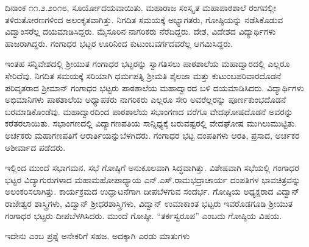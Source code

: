 {ದಿನಾಂಕ ೧೧.೨.೨೦೧೮, ಸೂರ್ಯೋದಯವಾಯಿತು. ಮಹಾರಾಜ ಸಂಸ್ಕೃತ ಮಹಾಪಾಠಶಾಲೆ ರಂಗವಲ್ಲೀ ತಳಿರುತೋರಣಗಳಿಂದ ಅಲಂಕೃತವಾಗಿತ್ತು. ನಿಗದಿತ ಸಮಯಕ್ಕೆ ಅಭ್ಯಾಗತರು, ಗೋಷ್ಠಿಯನ್ನು ನಡೆಸಿಕೊಡುವ ವಿದ್ವಾಂಸರೆಲ್ಲ ದಯಮಾಡಿಸಿದ್ದರು. ಮೈಸೂರಿನ ನಾಗರಿಕರು ನೆರೆದಿದ್ದರು. ದೇಶ, ವಿದೇಶದ ವಿದ್ಯಾರ್ಥಿಗಳು ಹಾಜರಾಗಿದ್ದರು. ಗಂಗಾಧರ ಭಟ್ಟರ ಊರಿನಿಂದ ಕುಟುಂಬವರ್ಗದವರೆಲ್ಲ ಆಗಮಿಸಿದ್ದರು. 

ಇಂತಹ ಸನ್ನಿವೇಶದಲ್ಲಿ ಶ್ರೀಯುತ ಗಂಗಾಧರ ಭಟ್ಟರನ್ನು ಸ್ವಾಗತಿಸಲು ಪಾಠ\-ಶಾಲೆಯ ಮಹಾದ್ವಾರದಲ್ಲಿ  ಎಲ್ಲರೂ ಸೇರಿದೆವು. ನಿಗದಿತ ಸಮಯಕ್ಕೆ ಸರಿಯಾಗಿ ಧರ್ಮಪತ್ನಿ ಶ್ರೀಮತಿ ಶೈಲಜಾ ಮತ್ತು ಕುಟುಂಬಪರಿವಾರದೊಡನೆ ಪರಿವೃತರಾದ ಶ್ರೀಮಾನ್ ಗಂಗಾಧರ ಭಟ್ಟರು ಪಾಠಶಾಲೆಯ ಮಹಾದ್ವಾರದ ಬಳಿ ದಯಮಾಡಿಸಿದರು. ವಿದ್ಯಾರ್ಥಿಗಳು ಅಭಿಮಾನಿಗಳು ಪಾಠಶಾಲೆಯ ಅಧ್ಯಾಪಕರು ನಾಗರಿಕರು ಎಲ್ಲರೂ ಸೇರಿ ಅವರೆಲ್ಲರನ್ನು ಪೂರ್ಣಕುಂಭದೊಡನೆ ಬರಮಾಡಿಕೊಂಡೆವು. ಮಹಾದ್ವಾರದಿಂದ ಪಾಠಶಾಲೆಯ ಸಭಾಂಗಣದ ವರೆಗೂ ವೇದಘೋಷದೊಡನೆ ಅವರನ್ನು ಕರೆತರಲಾಯಿತು. ಸಭಾಂಗಣದಲ್ಲಿ ವಿದ್ಯಾಗಣಪತಿಯ ಸಾನ್ನಿಧ್ಯಕ್ಕೆ ಬರುವಷ್ಟರಲ್ಲಿ ವೇದಘೋಷ ಮುಗಿಲುಮುಟ್ಟಿತು. ಅರ್ಚಕರು  ಮಹಾಗಣಪತಿಗೆ ಆರಾರ್ತಿಯನ್ನು\break ಬೆಳಗಿದರು. ಗಂಗಾಧರ ಭಟ್ಟ ದಂಪತಿಗಳು ಆರತಿ, ಪ್ರಸಾದ, ಅರ್ಚಕರ ಆಶೀರ್ವಾದ ಪಡೆದರು.

ಇಲ್ಲಿಂದ ಮುಂದೆ ಸಭಾಗಮನ. ಸಭೆ ಗೋಷ್ಠಿಗೆ ಅನುಕೂಲವಾಗಿ ಸಿದ್ಧವಾಗಿತ್ತು. ವಿಶೇಷವಾಗಿ ಸಭೆಯಲ್ಲಿ ಗಂಗಾಧರ ಭಟ್ಟರ ವಿದ್ಯಾಗುರುಗಳಾದ ಮಹಾಮಹೋಪಾ\-ಧ್ಯಾಯ ಎನ್.ಎಸ್.ರಾಮಭದ್ರಾಚಾರ್ಯ ದಂಪತಿಗಳ ಭಾವಚಿತ್ರವನ್ನು ಅಲಂಕರಿಸಲಾಗಿತ್ತು.  ಕಾರ್ಯಕ್ರಮದ ಉದ್ಘಾಟನೆಗಾಗಿ ದೀಪಬೆಳಗುವ ಸಂದರ್ಭ. ಗೋಷ್ಠಿಯ ಅಧ್ಯಕ್ಷರಾದ ವಿದ್ವಾನ್ ರಾಜೇಶ್ವರ ಶಾಸ್ತ್ರಿಗಳು, ವಿದ್ವಾನ್ ಶ್ರೀಧರಶಾಸ್ತ್ರಿಗಳು, ವಿದ್ವಾನ್ ಉಮಾಕಾಂತ ಭಟ್ಟರು ಇವರೊಡಗೂಡಿ ಶ್ರೀಯುತ ಗಂಗಾಧರ ಭಟ್ಟರು ದೀಪಬೆಳಗಿ\-ಸಿದರು. ಮುಂದೆ ಗೋಷ್ಠೀ. “ತರ್ಕಸ್ವರೂಪ” ಎಂಬದು ಗೋಷ್ಠಿಯ ವಿಷಯ.

ಇದೇನು ಎಂಬ ಪ್ರಶ್ನೆ ಅನೇಕರಿಗೆ ಸಹಜ. ಅದಕ್ಕಾಗಿ  ಎರಡು ಮಾತುಗಳು \enginline{-}

}
